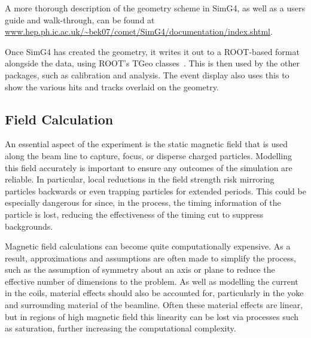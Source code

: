 A more thorough description of the geometry scheme  in SimG4, as well as a users guide and walk-through, can be found at \url{www.hep.ph.ic.ac.uk/~bek07/comet/SimG4/documentation/index.shtml}.

Once SimG4 has created the geometry, it writes it out to a ROOT-based format alongside the data, using ROOT's TGeo classes~\cite{ROOTTGeo}.
This is then used by the other packages, such as calibration and analysis.  
The event display also uses this to show the various hits and tracks overlaid on the geometry.

\subsection{Field Calculation}

An essential aspect of the \COMET experiment is the static magnetic field that is used along the beam line to capture, focus, or disperse charged particles.
Modelling this field accurately is important to ensure any outcomes of the simulation are reliable.
In particular, local reductions in the field strength risk mirroring particles backwards or even trapping particles for extended periods.
This could be especially dangerous for \COMET since, in the process, the timing information of the particle is lost, reducing the effectiveness of the timing cut to suppress backgrounds.

Magnetic field calculations can become quite computationally expensive.  
As a result, approximations and assumptions are often made to simplify the process, such as the assumption of symmetry about an axis or plane to reduce the effective number of dimensions to the problem.
As well as modelling the current in the coils, material effects should also be accounted for, particularly in the yoke and surrounding material of the beamline.
Often these material effects are linear, but in regions of high magnetic field this linearity can be lost via processes such as saturation, further increasing the computational complexity.

